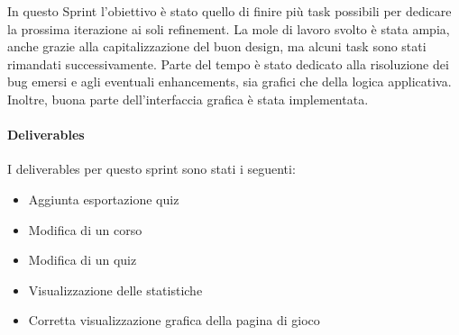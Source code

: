 In questo Sprint l'obiettivo è stato quello di finire più task possibili per dedicare la prossima iterazione ai soli refinement. La mole di lavoro svolto è stata ampia, anche grazie alla capitalizzazione del buon design, ma alcuni task sono stati rimandati successivamente.
Parte del tempo è stato dedicato alla risoluzione dei bug emersi e agli eventuali enhancements, sia grafici che della logica applicativa. Inoltre, buona parte dell'interfaccia grafica è stata implementata.
\paragraph{Deliverables} 
I deliverables per questo sprint sono stati i seguenti:
\begin{itemize}
    \item Aggiunta esportazione quiz
    \item Modifica di un corso
    \item Modifica di un quiz
    \item Visualizzazione delle statistiche
    \item Corretta visualizzazione grafica della pagina di gioco
\end{itemize}